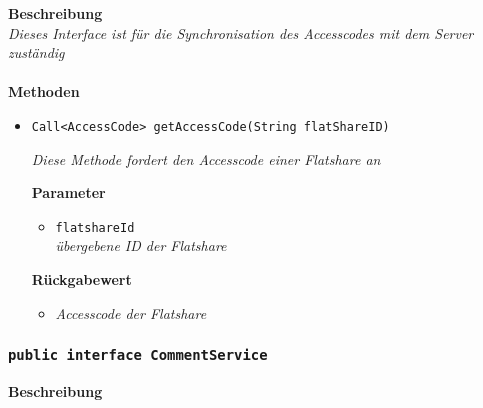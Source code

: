	\textbf{Beschreibung}\\
	\textit{Dieses Interface ist für die Synchronisation des Accesscodes mit dem Server zuständig }\\
    \\
	\textbf{Methoden}
		\begin{itemize}
		\item\texttt{{Call<AccessCode> getAccessCode(String flatShareID)}}

		\textit{Diese Methode fordert den Accesscode einer Flatshare an}

		\textbf{Parameter}
		\begin{itemize}
			\item\texttt{flatshareId}\\
			\textit {übergebene ID der Flatshare}
		 \end{itemize}
		 
		\textbf{Rückgabewert} 
		\begin{itemize}
		\item\textit{Accesscode der Flatshare}
		\end{itemize}

	 \end{itemize}

		\subsubsection{\texttt{public interface CommentService }}
		\textbf{Beschreibung}\\
		
